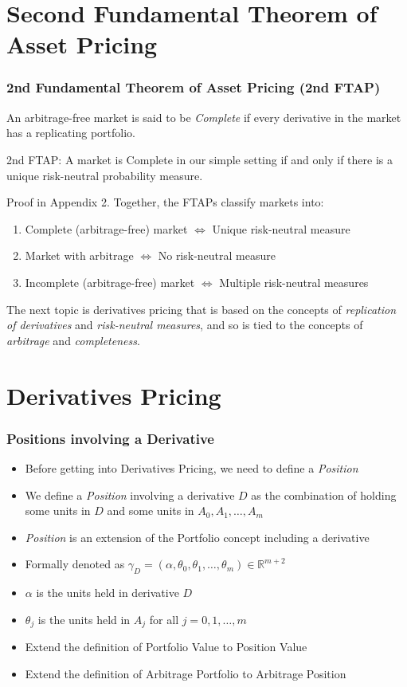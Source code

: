 \documentclass{beamer}
\begin{document}
\section{Second Fundamental Theorem of Asset Pricing}

\begin{frame}
\frametitle{2nd Fundamental Theorem of Asset Pricing (2nd FTAP)}
An arbitrage-free market is said to be {\em Complete} if every derivative in the market has a replicating portfolio.
\begin{theorem}
2nd FTAP: A market is Complete in our simple setting if and only if there is a unique risk-neutral probability measure.
\end{theorem}
Proof in Appendix 2. Together, the FTAPs classify markets into:
\begin{enumerate} 
\item Complete (arbitrage-free) market $\Leftrightarrow$ Unique risk-neutral measure
\item Market with arbitrage $\Leftrightarrow$ No risk-neutral measure
\item Incomplete (arbitrage-free) market $\Leftrightarrow$ Multiple risk-neutral measures
\end{enumerate}
The next topic is derivatives pricing that is based on the concepts of {\em replication of derivatives} and {\em risk-neutral measures}, and so is tied to the concepts of {\em arbitrage} and {\em completeness}.
\end{frame}

\section{Derivatives Pricing}

\begin{frame}
\frametitle{Positions involving a Derivative}
\begin{itemize}
\item Before getting into Derivatives Pricing, we need to define a {\em Position}
\item We define a {\em Position} involving a derivative $D$ as the combination of holding some units in $D$ and some units in $A_0, A_1, \ldots, A_m$
\item {\em Position} is an extension of the Portfolio concept including a derivative
\item Formally denoted as $\gamma_D = (\alpha, \theta_0, \theta_1, \ldots, \theta_m) \in \mathbb{R}^{m+2}$
\item $\alpha$ is the units held in derivative $D$
\item $\theta_j$ is the units held in $A_j$ for all $j = 0, 1, \ldots, m$
\item Extend the definition of Portfolio Value to Position Value 
\item Extend the definition of Arbitrage Portfolio to Arbitrage Position
\end{itemize}
\end{frame}
\end{document}
